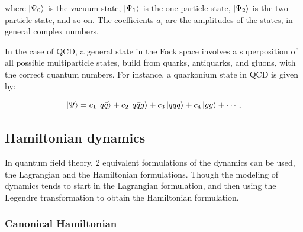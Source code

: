 \documentclass[11pt,a4paper,twoside,pdf]{article}
\numberwithin{equation}{section}
\begin{document}
where $\ket{\Psi_0}$ is the vacuum state, $\ket{\Psi_1}$ is the one particle
state, $\ket{\Psi_2}$ is the two particle state, and so on. The coefficients $a_i$
are the amplitudes of the states, in general complex numbers. 

In the case of QCD, a general state in the Fock space involves a superposition of all 
possible multiparticle states, build from quarks, antiquarks, and gluons, with the
correct quantum numbers. For instance, a quarkonium state in QCD is given by:

\begin{equation}
    \ket{\Psi} = c_1 \ket{q\bar{q}} + c_2 \ket{q\bar{q}g} + c_3 \ket{qqq} 
    + c_4 \ket{gg} + \cdots,
\end{equation}

\subsection{Hamiltonian dynamics}

In quantum field theory, 2 equivalent formulations of the dynamics can be used, 
the Lagrangian and the Hamiltonian formulations. Though the modeling of dynamics 
tends to start in the Lagrangian formulation, and then using the Legendre transformation
to obtain the Hamiltonian formulation. 

\subsubsection{Canonical Hamiltonian}\label{sec:canonical_hamiltonian}
\end{document}
